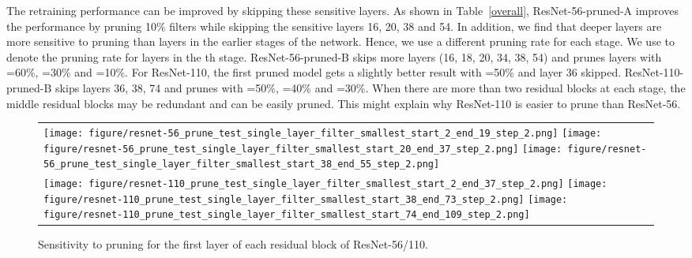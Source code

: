 \documentclass{article} \usepackage{iclr2017_conference,times}
\begin{document}
The retraining performance can be improved by skipping these sensitive layers.
As shown in Table~\ref{overall}, ResNet-56-pruned-A improves the performance by pruning 10\% filters while skipping the sensitive layers 16, 20, 38 and 54.
In addition, we find that deeper layers are more sensitive to pruning than layers in the earlier stages of the network.
Hence, we use a different pruning rate for each stage.
We use  to denote the pruning rate for layers in the th stage.
ResNet-56-pruned-B skips more layers (16, 18, 20, 34, 38, 54) and prunes layers with =60\%, =30\% and =10\%.
For ResNet-110, the first pruned model gets a slightly better result with =50\% and layer 36 skipped.
ResNet-110-pruned-B skips layers 36, 38, 74 and prunes with =50\%, =40\% and =30\%.
When there are more than two residual blocks at each stage, the middle residual blocks may be redundant and can be easily pruned.
This might explain why ResNet-110 is easier to prune than ResNet-56.

\begin{figure*}[tbp]
\centering
\begin{tabular}{l}
 \texttt{[image: figure/resnet-56\_prune\_test\_single\_layer\_filter\_smallest\_start\_2\_end\_19\_step\_2.png]}
 \texttt{[image: figure/resnet-56\_prune\_test\_single\_layer\_filter\_smallest\_start\_20\_end\_37\_step\_2.png]} 
 \texttt{[image: figure/resnet-56\_prune\_test\_single\_layer\_filter\_smallest\_start\_38\_end\_55\_step\_2.png]}\\
 \texttt{[image: figure/resnet-110\_prune\_test\_single\_layer\_filter\_smallest\_start\_2\_end\_37\_step\_2.png]}
 \texttt{[image: figure/resnet-110\_prune\_test\_single\_layer\_filter\_smallest\_start\_38\_end\_73\_step\_2.png]}
 \texttt{[image: figure/resnet-110\_prune\_test\_single\_layer\_filter\_smallest\_start\_74\_end\_109\_step\_2.png]}
\end{tabular}
\caption{Sensitivity to pruning for the first layer of each residual block of ResNet-56/110.}
\label{fig:prune_resnet-56/110}
\end{figure*}
\end{document}
